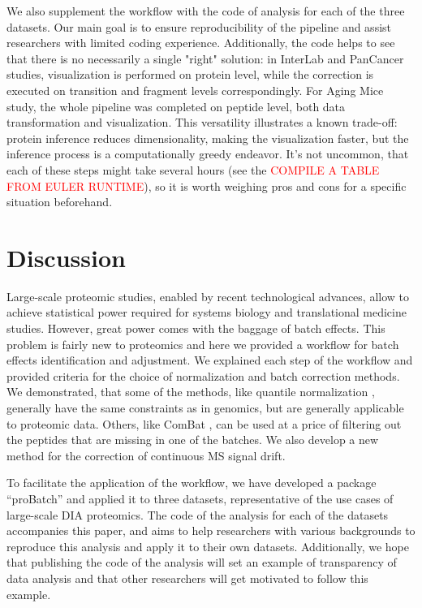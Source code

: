 \documentclass[num-refs]{wiley-article}
\begin{document}
We also supplement the workflow with the code of analysis for each of the three datasets. Our main goal is to ensure reproducibility of the pipeline and assist researchers with limited coding experience. Additionally, the code helps to see that there is no necessarily a single "right" solution: in InterLab and PanCancer studies, visualization is performed on protein level, while the correction is executed on transition and fragment levels correspondingly. For Aging Mice study, the whole pipeline was completed on peptide level, both data transformation and visualization. This versatility illustrates a known trade-off: protein inference reduces dimensionality, making the visualization faster, but the inference process is a computationally greedy endeavor. It's not uncommon, that each of these steps might take several hours (see the \textcolor{red}{COMPILE A TABLE FROM EULER RUNTIME}), so it is worth weighing pros and cons for a specific situation beforehand.


\section{Discussion}
Large-scale proteomic studies, enabled by recent technological advances, allow to achieve statistical power required for systems biology and translational medicine studies. However, great power comes with the baggage of batch effects. This problem is fairly new to proteomics and here we provided a workflow for batch effects identification and adjustment. We explained each step of the workflow and provided criteria for the choice of normalization and batch correction methods. We demonstrated, that some of the methods, like quantile normalization \cite{Bolstad2003}, generally have the same constraints as in genomics, but are generally applicable to proteomic data. Others, like ComBat \cite{Johnson:2007aa}, can be used at a price of filtering out the peptides that are missing in one of the batches. We also develop a new method for the correction of continuous MS signal drift.

To facilitate the application of the workflow, we have developed a package “proBatch” and applied it to three datasets, representative of the use cases of large-scale DIA proteomics. The code of the analysis for each of the datasets accompanies this paper, and aims to help researchers with various backgrounds to reproduce this analysis and apply it to their own datasets. Additionally, we hope that publishing the code of the analysis will set an example of transparency of data analysis and that other researchers will get motivated to follow this example.
\end{document}
